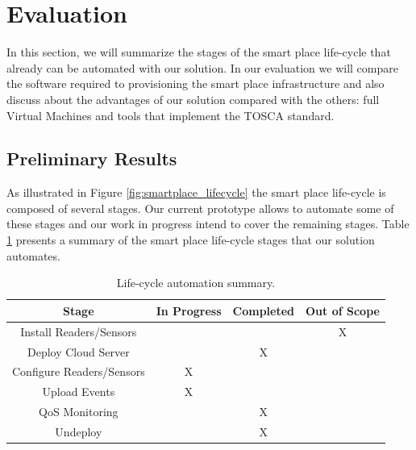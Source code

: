 \section{Evaluation}
\label{sec:evaluation}
In this section, we will summarize the stages of the smart place life-cycle that already can be
automated with our solution. In our evaluation we will compare the software required to provisioning
the smart place infrastructure and also discuss about the advantages of our solution compared with
the others: full Virtual Machines and tools that implement the TOSCA standard.

\subsection{Preliminary Results}
\label{sub:preliminary_results}
As illustrated in Figure \ref{fig:smartplace_lifecycle} the smart place life-cycle is composed of several
stages. Our current prototype allows to automate some of these stages and our work in progress intend
to cover the remaining stages. Table \ref{table:summary} presents a summary of the smart place
life-cycle stages that our solution automates.
\begin{table}[ht!]
    \centering
    \begin{tabular}{|c|c|c|c|}
    \hline
    Stage                     & In Progress & Completed   & Out of Scope \\ \hline
    Install Readers/Sensors   & ~           & ~           & X            \\ \hline
    Deploy Cloud Server       & ~           & X           & ~            \\ \hline
    Configure Readers/Sensors & X           & ~           & ~            \\ \hline
    Upload Events             & X           & ~           & ~            \\ \hline
    QoS Monitoring            & ~           & X           & ~            \\ \hline
    Undeploy                  & ~           & X           & ~            \\ \hline
    \end{tabular}
    \caption{Life-cycle automation summary.}
    \label{table:summary}
\end{table}

